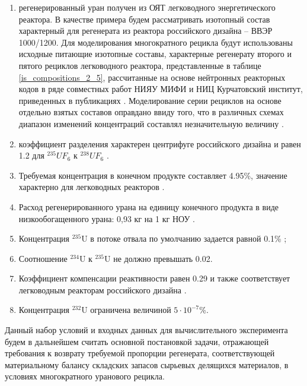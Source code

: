  \begin{enumerate}
  \item регенерированный уран получен из ОЯТ легководного энергетического реактора. В качестве примера будем рассматривать изотопный состав характерный для регенерата из реактора российского дизайна -- ВВЭР 1000/1200. Для моделирования многократного рецикла будут использованы исходные питающие изотопные составы, характерные регенерату второго и пятого рециклов легководного реактора, представленные в таблице \ref{is_compositions_2_5}, рассчитанные на основе нейтронных реакторных кодов в ряде совместных работ НИЯУ МИФИ и НИЦ Курчатовский институт, приведенных в публикациях \cite{palkinDesignanalyticalResearchRefinement2010,nevinicaToplivnyyCiklLegkovodnogo2019}. Моделирование серии рециклов на основе отдельно взятых составов оправдано ввиду того, что в различных схемах диапазон изменений концентраций составлял незначительную величину \cite{smirnovEvolutionIsotopicComposition2012}.
  \item коэффициент разделения характерен центрифуге российского дизайна и равен 1.2 для $^{235}UF_6$ к $^{238}UF_6$ \cite{smirnovEvolutionIsotopicComposition2012}.
  \item Требуемая концентрация в конечном продукте составляет 4.95\%, значение характерно для легководных реакторов \cite{solovevaCennostiOYaTKak2019}.
  \item Расход регенерированного урана на единицу конечного продукта в виде низкообогащенного урана: 0,93 кг на 1 кг НОУ \cite{smirnovApplyingEnrichmentCapacities2018}.
  \item Концентрация $^{235}$U в потоке отвала по умолчанию задается равной 0.1\% \cite{smirnovEvolutionIsotopicComposition2012};
  \item Соотношение $^{234}$U к $^{235}$U не должно превышать 0.02.
  \item Коэффициент компенсации реактивности равен 0.29 и также соответствует легководным реакторам российского дизайна \cite{smirnovApplyingEnrichmentCapacities2018}.
  \item Концентрация $^{232}$U ограничена величиной $5\cdot10^{-7}$\%.
\end{enumerate}

Данный набор условий и входных данных для вычислительного эксперимента будем в дальнейшем считать основной постановкой задачи, отражающей требования к возврату требуемой пропорции регенерата, соответствующей материальному балансу складских запасов сырьевых делящихся материалов, в условиях многократного уранового рецикла.

